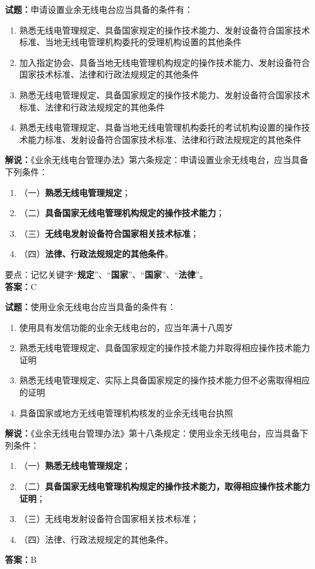 \documentclass{ctexbook}
\begin{document}
\noindent\textbf{试题：}申请设置业余无线电台应当具备的条件有：
\begin{enumerate}[leftmargin=3em]
  \item 熟悉无线电管理规定、具备国家规定的操作技术能力、发射设备符合国家技术标准、当地无线电管理机构委托的受理机构设置的其他条件
  \item 加入指定协会、具备当地无线电管理机构规定的操作技术能力、发射设备符合国家技术标准、法律和行政法规规定的其他条件
  \item 熟悉无线电管理规定、具备国家规定的操作技术能力、发射设备符合国家技术标准、法律和行政法规规定的其他条件
  \item 熟悉无线电管理规定、具备当地无线电管理机构委托的考试机构设置的操作技术能力标准、发射设备符合国家技术标准、法律和行政法规规定的其他条件
\end{enumerate}
\noindent\textbf{解说：}《业余无线电台管理办法》第六条规定：申请设置业余无线电台，应当具备下列条件：
\begin{enumerate}[label=, leftmargin=0.8em]
  \item （一）\textbf{熟悉无线电管理规定}；
  \item （二）\textbf{具备国家无线电管理机构规定的操作技术能力}；
  \item （三）\textbf{无线电发射设备符合国家相关技术标准}；
  \item （四）\textbf{法律、行政法规规定的其他条件}。
\end{enumerate}
要点：记忆关键字“\textbf{规定}”、“\textbf{国家}”、“\textbf{国家}”、“\textbf{法律}”。\\\noindent\textbf{答案：}C

\bigskip

\noindent\textbf{试题：}使用业余无线电台应当具备的条件有：
\begin{enumerate}[leftmargin=3em]
  \item 使用具有发信功能的业余无线电台的，应当年满十八周岁
  \item 熟悉无线电管理规定、具备国家规定的操作技术能力并取得相应操作技术能力证明
  \item 熟悉无线电管理规定、实际上具备国家规定的操作技术能力但不必需取得相应的证明
  \item 具备国家或地方无线电管理机构核发的业余无线电台执照
\end{enumerate}
\noindent\textbf{解说：}《业余无线电台管理办法》第十八条规定：使用业余无线电台，应当具备下列条件：
\begin{enumerate}[label=, leftmargin=0.8em]
  \item （一）\textbf{熟悉无线电管理规定}；
  \item （二）\textbf{具备国家无线电管理机构规定的操作技术能力，取得相应操作技术能力证明}；
  \item （三）无线电发射设备符合国家相关技术标准；
  \item （四）法律、行政法规规定的其他条件。
\end{enumerate}
\noindent\textbf{答案：}B
\end{document}
